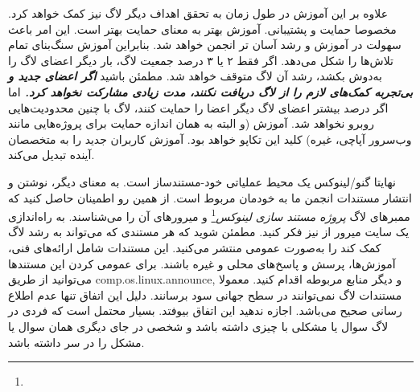 علاوه بر این آموزش در طول زمان به تحقق اهداف دیگر لاگ نیز کمک خواهد کرد.
مخصوصا حمایت و پشتیبانی. آموزش بهتر به معنای حمایت بهتر است.
این امر باعث سهولت در آموزش و رشد آسان تر انجمن خواهد شد.
بنابراین آموزش سنگ‌بنای تمام تلاش‌ها را شکل می‌دهد.
اگر فقط ۲ یا ۳ درصد جمعیت لاگ، بار دیگر اعضای لاگ را به‌دوش بکشد،
رشد آن لاگ متوقف خواهد شد. مطمئن باشید
{\bfseries {\itshape
اگر اعضای جدید و بی‌تجربه کمک‌های لازم را از لاگ دریافت نکنند، مدت زیادی مشارکت نخواهد کرد.
}}
اما اگر درصد بیشتر اعضای لاگ دیگر اعضا را حمایت کنند، لاگ با چنین محدودیت‌هایی روبرو نخواهد شد.
آموزش (و البته به همان اندازه حمایت برای پروژه‌هایی مانند وب‌سرور آپاچی،
 غیره) کلید این تکاپو خواهد بود. آموزش کاربران جدید را به متخصصان آینده تبدیل می‌کند.

نهایتا گنو/لینوکس یک محیط عملیاتی خود-مستندساز است.
به معنای دیگر، نوشتن و انتشار مستندات انجمن ما به خودمان مربوط است.
از همین رو اطمینان حاصل کنید که ممبر‌های لاگ
\emph{پروژه مستند سازی لینوکس}\footnote{}
و میرورهای آن را می‌شناسند.
به راه‌اندازی یک سایت میرور از  نیز فکر کنید.
مطمئن شوید که هر مستندی که می‌تواند به رشد لاگ کمک کند را
به‌صورت عمومی منتشر می‌کنید. این مستندات شامل ارائه‌های فنی، آموزش‌ها،
پرسش و پاسخ‌های محلی و غیره باشند. برای عمومی کردن این مستندها می‌توانید
از طریق
{\ttfamily comp.os.linux.announce}, 
و دیگر منابع مربوطه اقدام کنید.
معمولا مستندات لاگ نمی‌توانند در سطح جهانی سود برسانند. دلیل این اتفاق
تنها عدم اطلاع رسانی صحیح می‌باشد. اجازه ندهید این اتفاق بیوفتد.
بسیار محتمل است که فردی در لاگ سوال یا مشکلی با چیزی داشته باشد
و شخصی در جای دیگری همان سوال یا مشکل را در سر داشته باشد.
 
